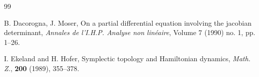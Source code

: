 \documentclass[12pt]{amsart}
\theoremstyle{definition}
\begin{document}
\begin{thebibliography} {99}








  B. Dacorogna, J. Moser,  On a partial differential equation involving the jacobian determinant, {\em Annales de l'I.H.P. Analyse non lin\'{e}aire}, Volume 7 (1990) no. 1, pp. 1--26.




 I. Ekeland and H. Hofer, Symplectic topology and
Hamiltonian dynamics, {\it Math. Z.}, \textbf{200} (1989), 355--378.






\end{thebibliography}
\end{document}
